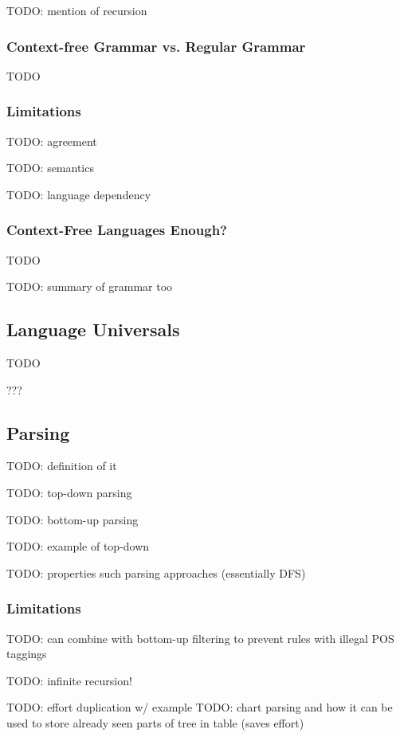 \documentclass{article}
\begin{document}
TODO: mention of recursion

\subsubsection{Context-free Grammar vs. Regular Grammar}

TODO

\subsubsection{Limitations}

TODO: agreement

TODO: semantics

TODO: language dependency

\subsubsection{Context-Free Languages Enough?}

TODO

TODO: summary of grammar too

\subsection{Language Universals}

TODO

???

\subsection{Parsing}

TODO: definition of it

TODO: top-down parsing

TODO: bottom-up parsing

TODO: example of top-down

TODO: properties such parsing approaches (essentially DFS)

\subsubsection{Limitations}

TODO: can combine with bottom-up filtering to prevent rules with illegal POS taggings

TODO: infinite recursion!

TODO: effort duplication w/ example
TODO: chart parsing and how it can be used to store already seen parts of tree in table (saves effort)
\end{document}
